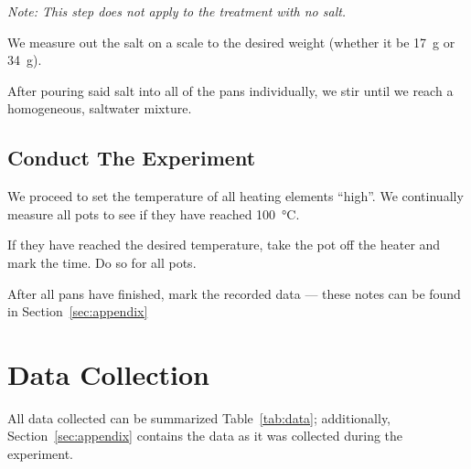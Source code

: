 \documentclass[12pt,titlepage=false]{scrartcl}
\begin{document}
\textit{Note: This step does not apply to the treatment with no salt.}

We measure out the salt on a scale to the desired weight (whether it be \SI{17}{\gram} or \SI{34}{\gram}).

After pouring said salt into all of the pans individually, we stir until we reach a homogeneous, saltwater mixture.

\subsection{Conduct The Experiment}
\label{sub:starting_heating_the_pots}

We proceed to set the temperature of all heating elements ``high''. We continually measure all pots to see if they have reached \SI{100}{\degreeCelsius}.

If they have reached the desired temperature, take the pot off the heater and mark the time. Do so for all pots.

After all pans have finished, mark the recorded data --- these notes can be found in Section~\ref{sec:appendix}

\section{Data Collection}
All data collected can be summarized Table~\ref{tab:data}; additionally, Section~\ref{sec:appendix} contains the data as it was collected during the experiment.

\begin{table}[H]
    \centering
    \caption{Number of Minutes To Reach \SI{100}{\degreeCelsius} (No Salt)}
    \label{tab:data}
\end{table}
\end{document}
